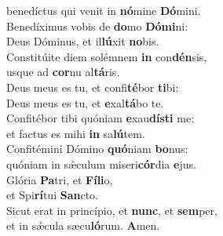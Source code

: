 \evenverse benedíctus qui venit in \textbf{nó}mine \textbf{Dó}mini.\\
\oddverse Benedíximus vobis de \textbf{do}mo \textbf{Dó}\textbf{mi}ni:~\*\\
\oddverse Deus Dóminus, et il\textbf{lú}xit \textbf{no}bis.\\
\evenverse Constitúite diem solémnem \textbf{in} con\textbf{dén}sis,~\*\\
\evenverse usque ad \textbf{cor}nu al\textbf{tá}ris.\\
\oddverse Deus meus es tu, et confi\textbf{té}bor \textbf{ti}bi:~\*\\
\oddverse Deus meus es tu, et \textbf{e}xal\textbf{tá}bo te.\\
\evenverse Confitébor tibi quóniam \textbf{e}xau\textbf{dí}\textbf{sti} me:~\*\\
\evenverse et factus es mihi \textbf{in} sa\textbf{lú}tem.\\
\oddverse Confitémini Dómino \textbf{quó}niam \textbf{bo}nus:~\*\\
\oddverse quóniam in sǽculum miseri\textbf{cór}dia \textbf{e}jus.\\
\evenverse Glória \textbf{Pa}tri, et \textbf{Fí}\textbf{li}o,~\*\\
\evenverse et Spi\textbf{rí}tui \textbf{San}cto.\\
\oddverse Sicut erat in princípio, et \textbf{nunc}, et \textbf{sem}per,~\*\\
\oddverse et in sǽcula sæcu\textbf{ló}rum. \textbf{A}men.\\
